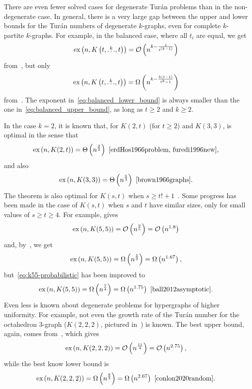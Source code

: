 There are even fewer solved cases for degenerate Turán problems than in the non-degenerate case.
In general, there is a very large gap between the upper and lower bounds for the Turán numbers of degenerate $k$-graphs,
even for complete $k$-partite $k$-graphs.
For example, in the balanced case, where all $t_i$ are equal, we get
\begin{equation} \label{eq:balanced_upper_bound}
    \text{ex} \left( n, K\left(t, \overset{k}{\dots}, t\right) \right) = \mathcal{O}\left(n^{k - \frac{1}{t^{(k-1)}}}\right)
\end{equation}
from~, but only
\begin{equation} \label{eq:balanced_lower_bound}
    \text{ex} \left( n, K\left(t, \overset{k}{\dots}, t\right) \right) = \Omega\left(n^{k - \frac{k(t-1)}{t^k - 1}}\right)
\end{equation}
from~.
The exponent in~\eqref{eq:balanced_lower_bound} is always
smaller than the one in~\eqref{eq:balanced_upper_bound},
as long as $t \geq 2$ and $k \geq 2$.

In the case $k=2$, it is known that, for $K(2, t)$ (for $t \geq 2$) and $K(3, 3)$,
 is optimal in the sense that
\[
    \text{ex} \left( n, K(2, t) \right)
    = \Theta\left(n^{\frac{3}{2}}\right)~\cite{erdHos1966problem, furedi1996new},
\]
and also
\[
    \text{ex} \left( n, K(3, 3) \right)
    = \Theta\left(n^{\frac{5}{3}}\right)~\cite{brown1966graphs}.
\]
The theorem is also optimal for $K(s, t)$ when $s \geq t! + 1$~\cite{kollar1996norm}.
Some progress has been made in the case of $K(s, t)$ when $s$ and $t$ have similar sizes,
only for small values of $s \geq t \geq 4$.
For example,  gives
\[
    \text{ex} \left( n, K(5,5) \right) = \mathcal{O}\left(n^{\frac{9}{5}}\right) = \mathcal{O}\left(n^{1.8}\right)
\]
and, by~, we get
\begin{equation} \label{eq:k55-probabilistic}
    \text{ex} \left( n, K(5,5) \right)
= \Omega\left(n^{\frac{5}{3}}\right)
= \Omega\left(n^{1.67}\right),
\end{equation}
but~\eqref{eq:k55-probabilistic} has been improved to
\[
    \text{ex} \left( n, K(5,5) \right)
    = \Omega\left(n^{\frac{7}{4}}\right)
    = \Omega\left(n^{1.75}\right)~\cite{ball2012asymptotic}.
\]
Even less is known about degenerate problems for hypergraphs of higher uniformity.
For example, not even the growth rate of the Turán number for the octahedron 3-graph
($K(2, 2, 2)$, pictured in~) is known.
The best upper bound, again, comes from~, which gives
\[
    \text{ex} \left( n, K(2, 2, 2) \right) = \mathcal{O}\left(n^{\frac{11}{4}}\right) = \mathcal{O}\left(n^{2.75}\right),
\]
while the best know lower bound is
\[
    \text{ex} \left( n, K(2, 2, 2) \right)
    = \Omega\left(n^{\frac{8}{3}}\right)
    = \Omega\left(n^{2.67}\right)~\cite{conlon2020random}.
\]

